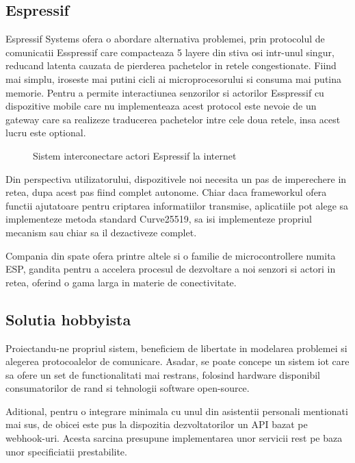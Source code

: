 \subsection {Espressif}

Espressif Systems ofera o abordare alternativa problemei, prin protocolul de comunicatii Esspressif care compacteaza 5 layere din stiva \acrfull{osi} intr-unul singur, reducand latenta cauzata de pierderea pachetelor in retele congestionate. Fiind mai simplu, iroseste mai putini cicli ai microprocesorului si consuma mai putina memorie. Pentru a permite interactiunea senzorilor si actorilor Esspressif cu dispozitive mobile care nu implementeaza acest protocol este nevoie de un gateway care sa realizeze traducerea pachetelor intre cele doua retele, insa acest lucru este optional.

\begin{figure}[h!]
  \centering
  \caption{Sistem interconectare actori Espressif la internet \cite{StackOverflow2021Espressif}}
\end{figure}

Din perspectiva utilizatorului, dispozitivele noi necesita un pas de imperechere in retea, dupa acest pas fiind complet autonome. Chiar daca frameworkul ofera functii ajutatoare pentru criptarea informatiilor transmise, aplicatiile pot alege sa implementeze metoda standard Curve25519, sa isi implementeze propriul mecanism sau chiar sa il dezactiveze complet.

Compania din spate ofera printre altele si o familie de microcontrollere numita ESP, gandita pentru a accelera procesul de dezvoltare a noi senzori si actori in retea, oferind o gama larga in materie de conectivitate.

\subsection {Solutia hobbyista}

Proiectandu-ne propriul sistem, beneficiem de libertate in modelarea problemei si alegerea protocoalelor de comunicare. Asadar, se poate concepe un sistem \acrshort{iot} care sa ofere un set de functionalitati mai restrans, folosind hardware disponibil consumatorilor de rand si tehnologii software open-source.

Aditional, pentru o integrare minimala cu unul din asistentii personali mentionati mai sus, de obicei este pus la dispozitia dezvoltatorilor un API bazat pe webhook-uri. Acesta sarcina presupune implementarea unor servicii \acrshort{rest} pe baza unor specificiatii prestabilite. 

